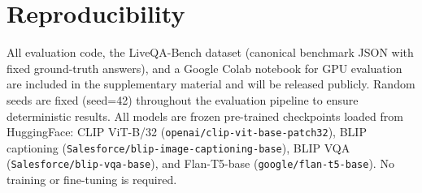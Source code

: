 \section{Reproducibility}
\label{sec:suppl_repro}

All evaluation code, the LiveQA-Bench dataset (canonical benchmark JSON with fixed ground-truth answers), and a Google Colab notebook for GPU evaluation are included in the supplementary material and will be released publicly.
Random seeds are fixed (seed=42) throughout the evaluation pipeline to ensure deterministic results.
All models are frozen pre-trained checkpoints loaded from HuggingFace: CLIP ViT-B/32 (\texttt{openai/clip-vit-base-patch32}), BLIP captioning (\texttt{Salesforce/blip-image-captioning-base}), BLIP VQA (\texttt{Salesforce/blip-vqa-base}), and Flan-T5-base (\texttt{google/flan-t5-base}).
No training or fine-tuning is required.

